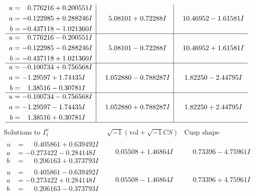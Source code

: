 \documentclass[1p]{elsarticle_modified}
\theoremstyle{definition}
\newcommand{\I}{\sqrt{-1}}
\begin{document}
$$\begin{array}{c|c|c}
\begin{aligned}
u &= \phantom{-}0.776216 + 0.200551 I \\
a &= -0.122985 + 0.288246 I \\
b &= -0.437118 - 1.021360 I\end{aligned}
 & \phantom{-}5.08101 + 0.72288 I & \phantom{-}10.46952 - 1.61581 I \\ \hline\begin{aligned}
u &= \phantom{-}0.776216 - 0.200551 I \\
a &= -0.122985 - 0.288246 I \\
b &= -0.437118 + 1.021360 I\end{aligned}
 & \phantom{-}5.08101 - 0.72288 I & \phantom{-}10.46952 + 1.61581 I \\ \hline\begin{aligned}
u &= -0.100734 + 0.756568 I \\
a &= -1.29597 + 1.74435 I \\
b &= \phantom{-}1.38516 - 0.30781 I\end{aligned}
 & \phantom{-}1.052880 - 0.788287 I & \phantom{-}1.82250 - 2.44795 I \\ \hline\begin{aligned}
u &= -0.100734 - 0.756568 I \\
a &= -1.29597 - 1.74435 I \\
b &= \phantom{-}1.38516 + 0.30781 I\end{aligned}
 & \phantom{-}1.052880 + 0.788287 I & \phantom{-}1.82250 + 2.44795 I\\
 \hline 
 \end{array}$$\newpage$$\begin{array}{c|c|c}  
\text{Solutions to }I^u_{1}& \I (\text{vol} + \sqrt{-1}CS) & \text{Cusp shape}\\
 \hline 
\begin{aligned}
u &= \phantom{-}0.405861 + 0.639492 I \\
a &= -0.273422 - 0.284148 I \\
b &= \phantom{-}0.206163 + 0.373793 I\end{aligned}
 & \phantom{-}0.05508 + 1.46864 I & \phantom{-}0.73396 - 4.75961 I \\ \hline\begin{aligned}
u &= \phantom{-}0.405861 - 0.639492 I \\
a &= -0.273422 + 0.284148 I \\
b &= \phantom{-}0.206163 - 0.373793 I\end{aligned}
 & \phantom{-}0.05508 - 1.46864 I & \phantom{-}0.73396 + 4.75961 I \\ \hline\begin{aligned}

\end{aligned}
\end{array}$$
\end{document}
